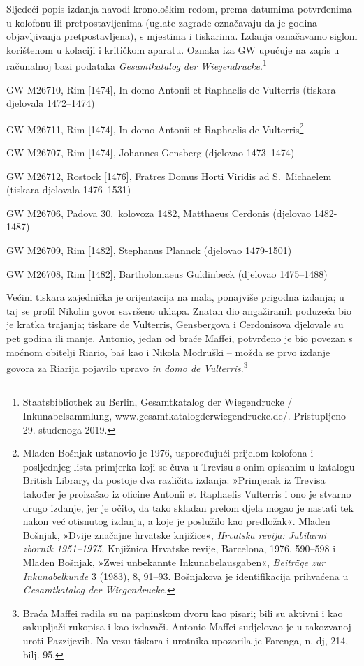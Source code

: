 \documentclass[a5paper,twoside]{article}
\begin{document}
Sljedeći popis izdanja navodi kronološkim redom, prema datumima potvrđenima u kolofonu ili pretpostavljenima (uglate zagrade označavaju da je godina objavljivanja pretpostavljena), s mjestima i tiskarima. Izdanja označavamo siglom korištenom u kolaciji i kritičkom aparatu. Oznaka iza GW upućuje na zapis u računalnoj bazi podataka \textit{Gesamtkatalog der Wiegendrucke}.\footnote{Staatsbibliothek zu Berlin, Gesamtkatalog der Wiegendrucke / Inkunabelsammlung, www.gesamtkatalogderwiegendrucke.de/. Pristupljeno 29. studenoga 2019.}

\begin{description}[nolistsep,itemsep=3pt,font=\rmfamily]
\item[V\hphantom{e}] GW M26710, Rim [1474], In domo Antonii et Raphaelis de Vulterris (tiskara djelovala 1472–1474)
\item[V1] GW M26711, Rim [1474], In domo Antonii et Raphaelis de Vulterris\footnote{Mladen Bošnjak ustanovio je 1976, uspoređujući prijelom kolofona i posljednjeg lista primjerka koji se čuva u Trevisu s onim opisanim u katalogu British Library, da postoje dva različita izdanja: »Primjerak iz Trevisa također je proizašao iz oficine Antonii et Raphaelis Vulterris i ono je stvarno drugo izdanje, jer je očito, da tako skladan prelom djela mogao je nastati tek nakon već otisnutog izdanja, a koje je poslužilo kao predložak«. Mladen Bošnjak, »Dvije značajne hrvatske knjižice«, \textit{Hrvatska revija: Jubilarni zbornik 1951–1975}, Knjižnica Hrvatske revije, Barcelona, 1976, 590–598 i Mladen Bošnjak, »Zwei unbekannte Inkunabelausgaben«, \textit{Beiträge zur Inkunabelkunde} 3 (1983), 8, 91–93. Bošnjakova je identifikacija prihvaćena u \textit{Gesamtkatalog der Wiegendrucke}.}
\item[Ge] GW M26707, Rim [1474], Johannes Gensberg (djelovao 1473–1474)
\item[R\hphantom{o}] GW M26712, Rostock [1476], Fratres Domus Horti Viridis ad S.~Michaelem (tiskara djelovala 1476–1531)
\item[C\hphantom{d}] GW M26706, Padova 30.~kolovoza 1482, Matthaeus Cerdonis (djelovao 1482-1487)
\item[P\hphantom{d}] GW M26709, Rim [1482], Stephanus Plannck (djelovao 1479-1501)
\item[Gd] GW M26708, Rim [1482], Bartholomaeus Guldinbeck (djelovao 1475–1488)
\end{description}

Većini tiskara zajednička je orijentacija na mala, ponajviše prigodna izdanja; u taj se profil Nikolin govor savršeno uklapa. Znatan dio angažiranih poduzeća bio je kratka trajanja; tiskare de Vulterris, Gensbergova i Cerdonisova djelovale su pet godina ili manje. Antonio, jedan od braće Maffei, potvrđeno je bio povezan s moćnom obitelji Riario, baš kao i Nikola Modruški – možda se prvo izdanje govora za Riarija pojavilo upravo \textit{in domo de Vulterris}.\footnote{Braća Maffei radila su na papinskom dvoru kao pisari; bili su aktivni i kao sakupljači rukopisa i kao izdavači. Antonio Maffei sudjelovao je u takozvanoj uroti Pazzijevih. Na vezu tiskara i urotnika upozorila je Farenga, n. dj, 214, bilj. 95.}
\end{document}
